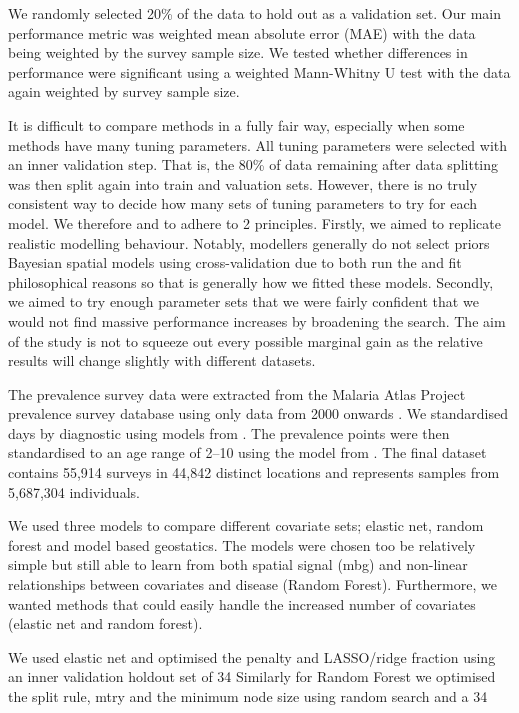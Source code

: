 \documentclass{bmcart}
\begin{document}
We randomly selected 20\% of the data to hold out as a validation set.
Our main performance metric was weighted mean absolute error (MAE) with the data being weighted by the survey sample size.
We tested whether differences in performance were significant using a weighted Mann-Whitny U test with the data again weighted by survey sample size.

It is difficult to compare methods in a fully fair way, especially when some methods have many tuning parameters.
All tuning parameters were selected with an inner validation step.
That is, the 80\% of data remaining after data splitting was then split again into train and valuation sets.
However, there is no truly consistent way to decide how many sets of tuning parameters to try for each model.
We therefore and to adhere to 2 principles.
Firstly, we aimed to replicate realistic modelling behaviour.
Notably, modellers generally do not select priors Bayesian spatial models using cross-validation due to both run the and fit philosophical reasons so that is generally how we fitted these models.
Secondly, we aimed to try enough parameter sets that we were fairly confident that we would not find massive performance increases by broadening the search.
The aim of the study is not to squeeze out every possible marginal gain as the relative results will change slightly with different datasets.


The prevalence survey data were extracted from the Malaria Atlas Project prevalence survey database using only data from 2000 onwards \cite{bhatt2015effect, guerra2007assembling, pfeffer2018ma}.
We standardised days by diagnostic using models from \cite{}.
The prevalence points were then standardised to an age range of 2--10 using the model from \cite{smith2007standardizing}.
The final dataset contains 55,914 surveys in 44,842 distinct locations and represents samples from 5,687,304 individuals.


We used three models to compare different covariate sets; elastic net, random forest and model based geostatics.
The models were chosen too be relatively simple but still able to learn from both spatial signal (mbg) and non-linear relationships between covariates and disease (Random Forest).
Furthermore, we wanted methods that could easily handle the increased number of covariates (elastic net and random forest).

We used elastic net \cite{enet} and optimised the penalty and LASSO/ridge fraction using an inner validation holdout set of 34%
Similarly for Random Forest we optimised the split rule, mtry and the minimum node size using random search and a 34%
\end{document}

